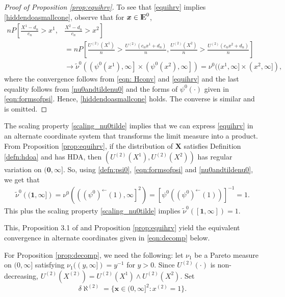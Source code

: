 \documentclass[11 pt]{amsart}
\numberwithin{equation}{section}
\begin{document}
\begin{proof}[Proof of Proposition \ref{prop:equihrv}] {To see
    that}
 \eqref{equihrv} implies \eqref{hiddendoasmallcone}, observe that for ${\boldsymbol x} \in {\mathop{\rm I\kern -0.20em E}\nolimits}^0$,
\begin{align*}
nP\left[ \frac{X^1 - d_n}{c_n} > x^1, \right. & \left. \frac{X^2- {d}_n}{{c}_n} >  x^2 \right] \\
&= nP\left[  \frac{U^{(2)}(X^1)}{n} > \frac{U^{(2)}(c_n x^1 + d_n)}{n}, \frac{U^{(2)}(X^2)}{n} > \frac{U^{(2)}(c_n x^2 + d_n)}{n}\right]\\
& \rightarrow \tilde \nu^0 \left( \left(\psi^0(x^1), \infty \right] \times \left(\psi^0(x^2), \infty \right] \right) = \nu^0( (x^1, \infty] \times (x^2, \infty]),
\end{align*}
where the convergence follows from \eqref{eqn: Hconv} and
\eqref{equihrv} and the last equality follows from
\eqref{nu0andtildenu0} and the forms of $\psi^0(\cdot)$ given in
\eqref{eqn:formsofpsi}. Hence, 
\eqref{hiddendoasmallcone} holds. 
The {converse} is similar and  is omitted.
\end{proof}

The scaling property \eqref{scaling_nu0tilde} implies that 
we can express \eqref{equihrv} in an alternate coordinate system that
transforms the limit measure into a product.
{}From Proposition \ref{prop:equihrv}, if the
distribution of ${\boldsymbol X}$ satisfies Definition \ref{defn:hdoa} and  has HDA, then
$(U^{(2)}(X^1), U^{(2)}(X^2))$ has regular variation on $({\boldsymbol 0},
{\boldsymbol \infty}]$. So, using \eqref{defn:psi0}, \eqref{eqn:formsofpsi} and
\eqref{nu0andtildenu0}, we get that 
\begin{align*}
\tilde \nu^0 \left(({\boldsymbol 1}, {\boldsymbol \infty}]  \right) =  \nu^0 \left({\left( {\left(\psi^0 \right)}^{\leftarrow}(1), \infty \right]}^2 \right) = {[\psi^0({\left(\psi^0 \right)}^{\leftarrow}(1)) ]}^{-1} = 1.
\end{align*}
This plus the scaling property \eqref{scaling_nu0tilde}
implies $\tilde \nu^0 ([{\boldsymbol 1}, {\boldsymbol \infty}]  ) =
1$. {This, Proposition 3.1 of  \cite{mitra:resnick:2010a} and
Proposition \ref{prop:equihrv} yield  the equivalent convergence in alternate coordinates
  given in \eqref{eqn:decomp}
  below.

For Proposition \ref{prop:decomp}, we need the following:
let $\nu_1$ be a Pareto
measure on $(0, \infty]$  satisfying $\nu_1((y, \infty]) = y^{-1}$ for
$y > 0$.  Since  $U^{(2)}(\cdot)$ is non-decreasing, $U^{(2)}(
    X^{(2)}) = U^{(2)}(X^1) \wedge U^{(2)}(X^2)$. Set
$$\delta \aleph^{(2)} =  \{ {\boldsymbol x}  \in (0, \infty]^2 :
x^{(2)} = 1\}.$$  }
\end{document}
